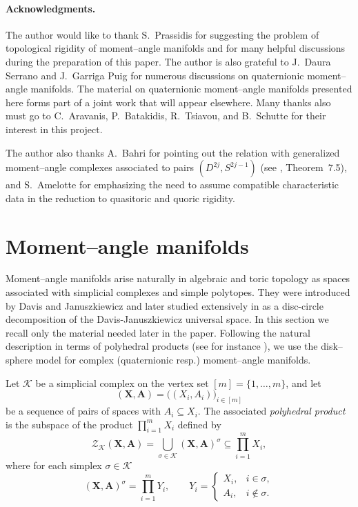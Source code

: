 \documentclass[11pt,a4paper]{article}
\numberwithin{equation}{section}
\theoremstyle{named}
\begin{document}
\medskip


\paragraph{Acknowledgments.}
The author would like to thank S.~Prassidis for suggesting the problem of topological rigidity of moment--angle manifolds and for many helpful discussions during the preparation of this paper. The author is also grateful to J.~Daura Serrano and J.~Garriga Puig for numerous discussions on quaternionic moment--angle manifolds. The material on quaternionic moment--angle manifolds presented here forms part of a joint work that will appear elsewhere. Many thanks also must go to C.~Aravanis, P.~Batakidis, R.~Tsiavou, and B.~Schutte for their interest in this project.

The author also thanks A.~Bahri for pointing out the relation with generalized moment--angle complexes associated to pairs \((D^{2j},S^{2j-1})\) (see \cite{bbcg15}, Theorem~7.5), and S.~Amelotte for emphasizing the need to assume compatible characteristic data in the reduction to quasitoric and quoric rigidity.

\section{Moment--angle manifolds}
\label{sec:moment_angle}

Moment--angle manifolds arise naturally in algebraic and toric topology as spaces associated with simplicial complexes and simple polytopes. They were introduced by Davis and Januszkiewicz \cite{dj} and later studied extensively in \cite{bp} as a disc-circle decomposition of the Davis-Januszkiewicz universal space. In this section we recall only the material needed later in the paper. Following the natural description in terms of polyhedral products (see for instance \cite{bbcg}), we use the disk--sphere model for complex (quaternionic resp.) moment--angle manifolds.

Let \(\mathcal K\) be a simplicial complex on the vertex set \([m]=\{1,\ldots,m\}\), and let
\[
    (\mathbf X,\mathbf A)=\bigl((X_i,A_i)\bigr)_{i\in[m]}
\]
be a sequence of pairs of spaces with \(A_i\subseteq X_i\). The associated \emph{polyhedral product} is the subspace of the product \(\prod_{i=1}^m X_i\) defined by
\[
    \mathcal Z_{\mathcal K}(\mathbf X,\mathbf A)
    =
    \bigcup_{\sigma\in \mathcal K}
    (\mathbf X,\mathbf A)^\sigma
    \subseteq
    \prod_{i=1}^m X_i,
\]
where for each simplex \(\sigma\in \mathcal  K\)
\[
    (\mathbf X,\mathbf A)^\sigma
    =
    \prod_{i=1}^m Y_i,
    \qquad
    Y_i=
    \begin{cases}
    X_i, & i\in \sigma,\\
    A_i, & i\notin \sigma.
    \end{cases}
\]
\end{document}
